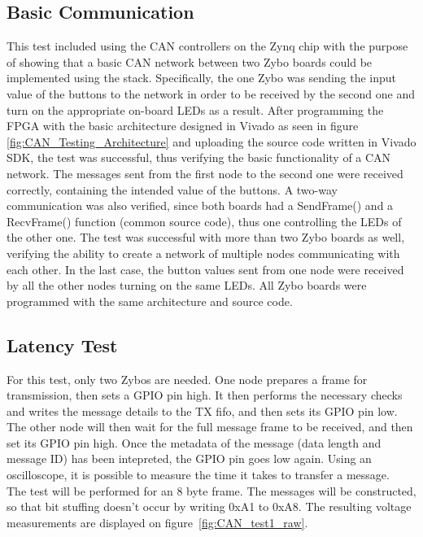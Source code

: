 \subsection{Basic Communication}
\label{sub:TestingCANStack_BareMetal}
This test included using the CAN controllers on the Zynq chip with the purpose of showing that a basic CAN network between two Zybo boards could be implemented using the stack.
Specifically, the one Zybo was sending the input value of the buttons to the network in order to be received by the second one and turn on the appropriate on-board LEDs as a result.
After programming the FPGA with the basic architecture designed in Vivado as seen in figure \ref{fig:CAN_Testing_Architecture} and uploading the source code written in Vivado SDK, the test was successful, thus verifying the basic functionality of a CAN network.
The messages sent from the first node to the second one were received correctly, containing the intended value of the buttons.
A two-way communication was also verified, since both boards had a SendFrame() and a RecvFrame() function (common source code), thus one controlling the LEDs of the other one.
The test was successful with more than two Zybo boards as well, verifying the ability to create a network of multiple nodes communicating with each other.
In the last case, the button values sent from one node were received by all the other nodes turning on the same LEDs.
All Zybo boards were programmed with the same architecture and source code.

\subsection{Latency Test}\label{sub:CAN_latency}
For this test, only two Zybos are needed.
One node prepares a frame for transmission, then sets a GPIO pin high.
It then performs the necessary checks and writes the message details to the TX fifo, and then sets its GPIO pin low. \\

The other node will then wait for the full message frame to be received, and then set its GPIO pin high.
Once the metadata of the message (data length and message ID) has been intepreted, the GPIO pin goes low again.
Using an oscilloscope, it is possible to measure the time it takes to transfer a message.\\

The test will be performed for an 8 byte frame.
The messages will be constructed, so that bit stuffing doesn't occur by writing 0xA1 to 0xA8. 
The resulting voltage measurements are displayed on figure~\ref{fig:CAN_test1_raw}.\\


